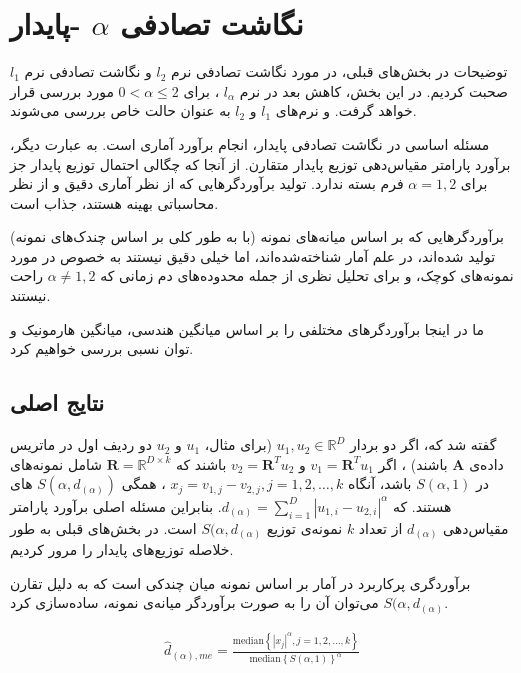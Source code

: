 \section{
نگاشت تصادفی 
$\alpha$
-پایدار
}
توضیحات
در بخش‌های قبلی، در مورد نگاشت تصادفی نرم 
$l_2$
و نگاشت تصادفی نرم
$l_1$
صحبت کردیم. در این بخش، کاهش بعد در نرم 
$l_\alpha$
، برای 
$0 < \alpha \leq 2$
مورد بررسی قرار خواهد گرفت. و نرم‌های 
$l_1$
و 
$l_2$
به عنوان حالت خاص بررسی می‌شوند.

مسئله اساسی در نگاشت تصادفی پایدار، انجام برآورد آماری است. به عبارت دیگر، برآورد پارامتر مقیاس‌دهی توزیع پایدار متقارن. از آنجا که  چگالی احتمال توزیع پایدار جز برای 
$\alpha = 1, 2$
فرم بسته‌ ندارد. تولید برآوردگرهایی که از نظر آماری دقیق و از نظر محاسباتی بهینه هستند، جذاب است.

برآوردگرهایی که بر اساس میانه‌های نمونه (با به طور کلی بر اساس چندک‌های نمونه) تولید شده‌اند، در علم آمار شناخته‌شده‌اند، اما خیلی دقیق نیستند به خصوص در مورد نمونه‌های کوچک، و برای تحلیل نظری از جمله محدوده‌های دم زمانی که 
$\alpha \neq 1, 2$
راحت نیستند. 

ما در اینجا برآوردگر‌های مختلفی را بر اساس میانگین هندسی، میانگین هارمونیک
 و توان نسبی 
بررسی خواهیم کرد.


\subsection{
نتایج اصلی
}
گفته شد که، اگر دو بردار 
$u_1, u_2 \in \mathbb{R}^D$
(برای مثال،
$u_1$
و 
$u_2$
دو ردیف اول در ماتریس داده‌ی 
$\mathbf{A}$
باشند)
، اگر 
$v_1 = \mathbf{R}^T u_1$
و 
$v_2 = \mathbf{R}^T u_2$
باشند که 
$\mathbf{R} = \mathbb{R}^{D \times k}$
شامل نمونه‌های 
در 
$S(\alpha, 1)$
باشد، آنگاه 
$x_j = v_{1,j} - v_{2,j}, j = 1,2, \ldots, k$
، همگی
$S(\alpha, d_{(\alpha)})$
های 
هستند. که
$d_{(\alpha)} = \sum_{i=1}^D \left| u_{1,i} - u_{2,i} \right|^{\alpha}$.
بنابراین مسئله اصلی برآورد پارامتر مقیاس‌دهی 
$d_{(\alpha)}$
از تعداد 
$k$
نمونه‌ی 
توزیع
$S(\alpha, d_{(\alpha)}$
است. 
در بخش‌های قبلی به طور خلاصله توزیع‌های پایدار را مرور کردیم.

برآوردگری پرکاربرد در آمار بر اساس نمونه میان چندکی %
\cite{litez67, litez68, litez138}
است  که به دلیل تقارن 
$S(\alpha, d_{(\alpha)}$
می‌توان آن را به صورت برآوردگر میانه‌ی نمونه، ساده‌سازی کرد.

\begin{align}
\hat{d}_{(\alpha),me} = \frac
{ \mathrm{median} \left \{ \left| x_j \right|^{\alpha} , j = 1,2, \ldots, k \right \} }
{ \mathrm{median} \left \{ S(\alpha, 1) \right \}^{\alpha} }
\label{eq:1iW}
\end{align}

